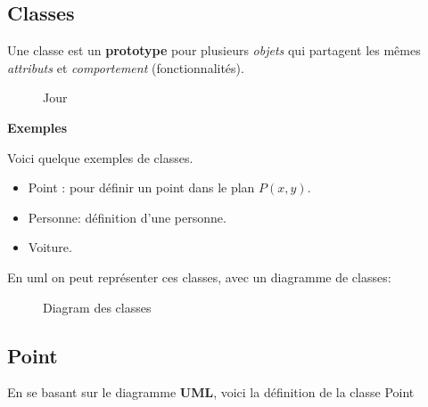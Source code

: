 \documentclass[letterpaper,10pt,english]{sphinxmanual}
\begin{document}
\subsection{Classes}
\label{classes:classes}
Une classe est un \textbf{prototype} pour plusieurs \emph{objets} qui partagent les mêmes \emph{attributs} et \emph{comportement} (fonctionnalités).
\begin{figure}[htbp]
\centering
\capstart

\caption{Jour}\end{figure}

\textbf{Exemples}

Voici quelque exemples de classes.
\begin{itemize}
\item {} 
Point : pour définir un point dans le plan \(P(x,y)\).

\item {} 
Personne: définition d'une personne.

\item {} 
Voiture.

\end{itemize}

En uml on peut représenter ces classes, avec un diagramme de classes:
\begin{figure}[htbp]
\centering
\capstart

\caption{Diagram des classes}\end{figure}


\subsection{Point}
\label{classes:point}
En se basant sur le diagramme \textbf{UML}, voici la définition de la classe Point
\end{document}
